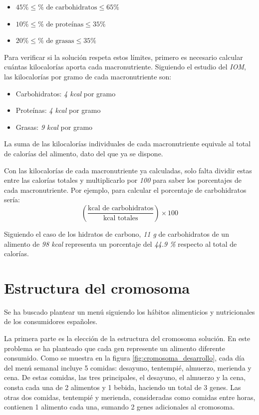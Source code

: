 \begin{itemize}
    \item $45\% \leq \% \text{ de carbohidratos} \leq 65\%$
    \item $10\% \leq \% \text{ de proteínas} \leq 35\%$
    \item $20\% \leq \% \text{ de grasas} \leq 35\%$
\end{itemize}

Para verificar si la solución respeta estos límites, primero es necesario calcular cuántas kilocalorías aporta cada macronutriente. Siguiendo el estudio del \textit{IOM}, las kilocalorías por gramo de cada macronutriente son:

\begin{itemize}
    \item Carbohidratos: \textit{4 kcal} por gramo
    \item Proteínas: \textit{4 kcal} por gramo
    \item Grasas: \textit{9 kcal} por gramo
\end{itemize}

La suma de las kilocalorías individuales de cada macronutriente equivale al total de calorías del alimento, dato del que ya se dispone.

Con las kilocalorías de cada macronutriente ya calculadas, solo falta dividir estas entre las calorías totales y multiplicarlo por \textit{100} para saber los porcentajes de cada macronutriente. Por ejemplo, para calcular el porcentaje de carbohidratos sería:
\[
\left( \frac{\text{kcal de carbohidratos}}{\text{kcal totales}} \right) \times 100
\]

Siguiendo el caso de los hidratos de carbono, \textit{11 g} de carbohidratos de un alimento de \textit{98 kcal} representa un porcentaje del \textit{44.9 \%} respecto al total de calorías.


\section{Estructura del cromosoma}
\label{ch:solucion-planteada}

Se ha buscado plantear un menú siguiendo los hábitos alimenticios y nutricionales de los consumidores españoles.

La primera parte es la elección de la estructura del cromosoma solución. En este problema se ha planteado que cada gen represente un alimento diferente consumido. Como se muestra en la figura \ref{fig:cromosoma_desarrollo}, cada día del menú semanal incluye 5 comidas: desayuno, tentempié, almuerzo, merienda y cena. De estas comidas, las tres principales, el desayuno, el almuerzo y la cena, consta cada una de 2 alimentos y 1 bebida, haciendo un total de 3 genes. Las otras dos comidas, tentempié y merienda, consideradas como comidas entre horas, contienen 1 alimento cada una, sumando 2 genes adicionales al cromosoma.

